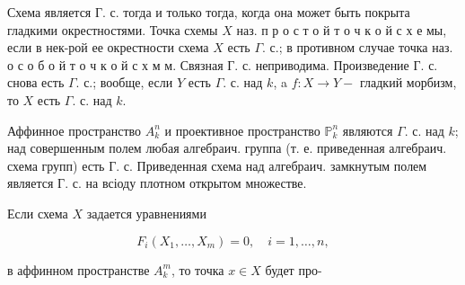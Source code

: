 \documentclass[10pt]{article}
\begin{document}
Схема является $Г$. с. тогда и только тогда, когда она может быть покрыта гладкими окрестностями. Точка схемы $X$ наз. п р о с т о й т о ч к о й с х е мы, если в нек-рой ее окрестности схема $X$ есть $\Gamma$. с.; в противном случае точка наз. о с о б о й т о ч к о й с х м м. Связная Г. с. неприводима. Произведение $Г$. с. снова есть $\Gamma$. с.; вообще, если $Y$ есть $\Gamma$. с. над $k$, a $f: X \rightarrow Y-$ гладкий морбизм, то $X$ есть $\Gamma$. с. над $k$.



Аффинное пространство $A_{k}^{n}$ и проективное пространство $\mathbb{P}_{k}^{n}$ являются $\Gamma$. с. над $k$; над совершенным полем любая алгебраич. группа (т. е. приведенная алгебраич. схема групп) есть Г. с. Приведенная схема над алгебраич. замкнутым полем является Г. с. на всіоду плотном открытом множестве.



Если схема $X$ задается уравнениями



\[

F_{i}\left(X_{1}, \ldots, X_{m}\right)=0, \quad i=1, \ldots, n,

\]



в аффинном пространстве $A_{k}^{m}$, то точка $x \in X$ будет про-
\end{document}
